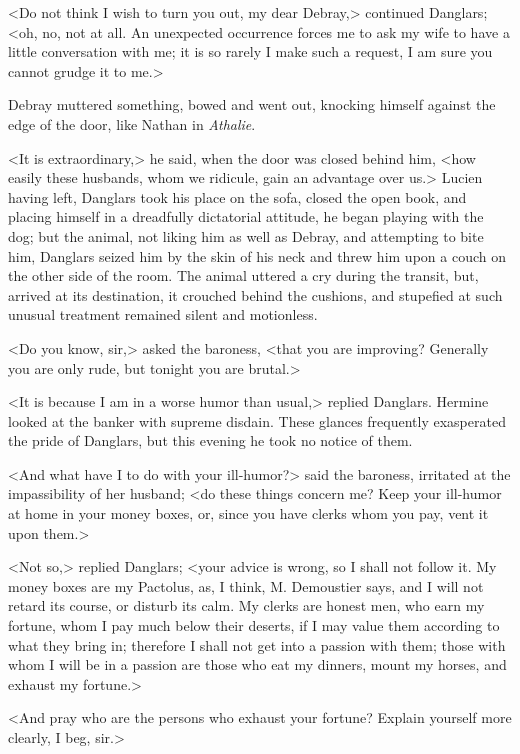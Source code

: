  <Do not think I wish to turn you out, my dear Debray,> continued Danglars; <oh, no, not at all. An unexpected occurrence forces me to ask my wife to have a little conversation with me; it is so rarely I make such a request, I am sure you cannot grudge it to me.> 

 Debray muttered something, bowed and went out, knocking himself against the edge of the door, like Nathan in \textit{Athalie}. 

 <It is extraordinary,> he said, when the door was closed behind him, <how easily these husbands, whom we ridicule, gain an advantage over us.>  Lucien having left, Danglars took his place on the sofa, closed the open book, and placing himself in a dreadfully dictatorial attitude, he began playing with the dog; but the animal, not liking him as well as Debray, and attempting to bite him, Danglars seized him by the skin of his neck and threw him upon a couch on the other side of the room. The animal uttered a cry during the transit, but, arrived at its destination, it crouched behind the cushions, and stupefied at such unusual treatment remained silent and motionless. 

 <Do you know, sir,> asked the baroness, <that you are improving? Generally you are only rude, but tonight you are brutal.> 

 <It is because I am in a worse humor than usual,> replied Danglars. Hermine looked at the banker with supreme disdain. These glances frequently exasperated the pride of Danglars, but this evening he took no notice of them. 

 <And what have I to do with your ill-humor?> said the baroness, irritated at the impassibility of her husband; <do these things concern me? Keep your ill-humor at home in your money boxes, or, since you have clerks whom you pay, vent it upon them.> 

 <Not so,> replied Danglars; <your advice is wrong, so I shall not follow it. My money boxes are my Pactolus, as, I think, M. Demoustier says, and I will not retard its course, or disturb its calm. My clerks are honest men, who earn my fortune, whom I pay much below their deserts, if I may value them according to what they bring in; therefore I shall not get into a passion with them; those with whom I will be in a passion are those who eat my dinners, mount my horses, and exhaust my fortune.> 

 <And pray who are the persons who exhaust your fortune? Explain yourself more clearly, I beg, sir.> 


